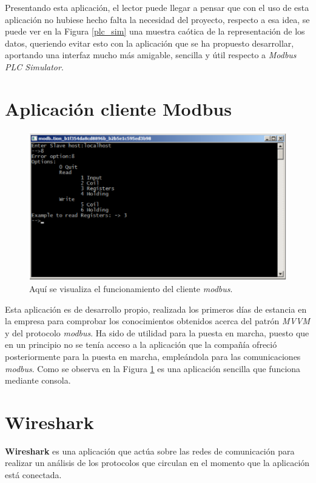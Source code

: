 \documentclass[pdftex,11pt,a4paper]{book}
\begin{document}
Presentando esta aplicación, el lector puede llegar a pensar que con el uso de esta aplicación no hubiese hecho falta la necesidad del proyecto, respecto a esa idea, se puede ver en la Figura \ref{plc_sim} una muestra caótica de la representación de los datos, queriendo evitar esto con la aplicación que se ha propuesto desarrollar, aportando una interfaz mucho más amigable, sencilla y útil respecto a \emph{Modbus PLC Simulator}.

\section{Aplicación cliente Modbus}
\begin{figure}[H]
\begin{center}
\includegraphics[width=\textwidth]{img/cliente_modbus.png}
\caption{\label{plc_cli}Aquí se visualiza el funcionamiento del cliente \emph{modbus}.}
\end{center}
\end{figure}

Esta aplicación es de desarrollo propio, realizada los primeros días de estancia en la empresa para comprobar los conocimientos obtenidos acerca del patrón \emph{MVVM} y del protocolo \emph{modbus}. Ha sido de utilidad para la puesta en marcha, puesto que en un principio no se tenía acceso a la aplicación que la compañía ofreció posteriormente para la puesta en marcha, empleándola para las comunicaciones \emph{modbus}. Como se observa en la Figura \ref{plc_cli} es una aplicación sencilla que funciona mediante consola.

\section{Wireshark}

\textbf{Wireshark} \cite{wireshark} es una aplicación que actúa sobre las redes de comunicación para realizar un análisis de los protocolos que circulan en el momento que la aplicación está conectada.
\end{document}
